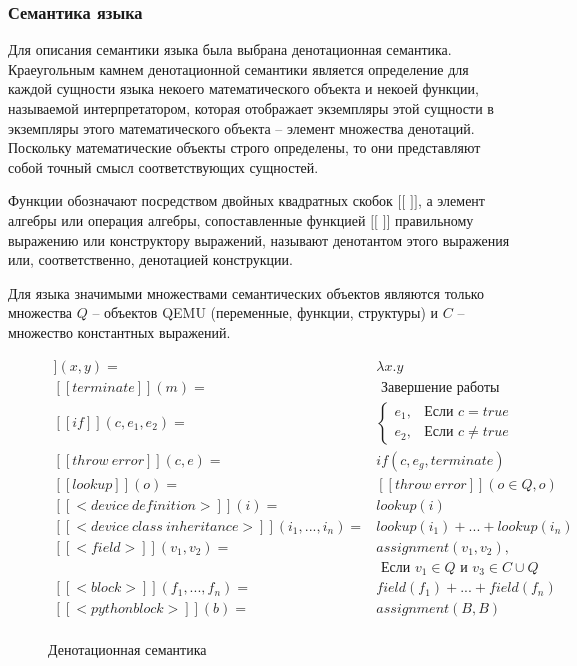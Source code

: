 \subsubsection{Семантика языка}\label{sec:ch2/sec1/sub1/sub3}

Для описания семантики языка {\mylanguage} была выбрана денотационная семантика.
Краеугольным камнем денотационной семантики является определение для каждой сущности
языка некоего математического объекта и некоей функции, называемой интерпретатором,
которая отображает экземпляры этой сущности в экземпляры этого математического объекта -- элемент множества денотаций.
Поскольку математические объекты строго определены, то они представляют собой точный
смысл соответствующих сущностей.

Функции обозначают посредством двойных квадратных скобок $[[$ $]]$,
а элемент алгебры или операция алгебры, сопоставленные функцией $[[$ $]]$
правильному выражению или конструктору выражений, называют денотантом этого выражения или,
соответственно, денотацией конструкции. \cite{denotational-semantics}

Для языка {\mylanguage} значимыми множествами семантических объектов
являются только множества $Q$ -- объектов QEMU (переменные, функции, структуры) и
$C$ -- множество константных выражений.


\begin{figure}[!htbp]
    \centering
    \begingroup
    \addtolength{\jot}{1em}
    \begin{align*}
        [[assignment]](x,y) ={}& \lambda x.y \\
        [[terminate]](m) ={}& \text{ Завершение работы компилятора} \\
        [[if]](c,e_1,e_2) ={}&
        \begin{cases}
            e_1, & \text{Если } c = true \\
            e_2, & \text{Если } c \not= true
        \end{cases} \\
        [[throw\ error]](c, e) ={}& if(c, e_g, terminate) \\
        [[lookup]](o) ={}& [[throw\ error]](o \in Q, o) \\
        [[<device\ definition>]](i) ={}& lookup(i) \\
        [[<device\ class\ inheritance>]](i_1,...,i_n) ={}& lookup(i_1) + ... + lookup(i_n) \\
        [[<field>]](v_1, v_2) ={}& assignment(v_1, v_2),\\ & \text{ Если } v_1 \in Q \text{ и } v_3 \in C \cup Q \\
        [[<block>]](f_1,...,f_n) ={}& field(f_1) + ... + field(f_n) \\
        [[<python block>]](b) ={}& assignment(B,B)\\
    \end{align*}
    \endgroup
    \caption{Денотационная семантика {\mylanguage}}\label{fig:denotational-semantics}
\end{figure}


